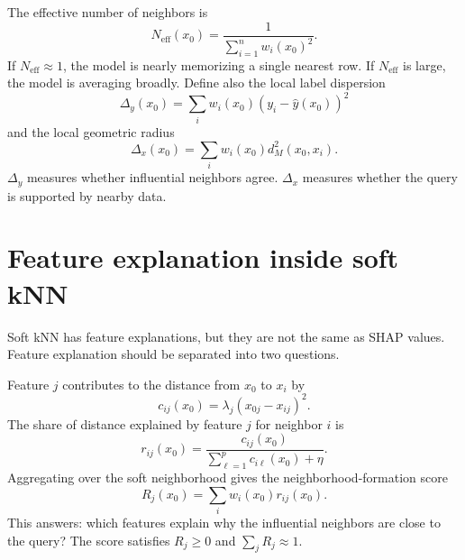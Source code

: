 \documentclass[11pt]{article}
\newcommand{\1}{\mathbf{1}}
\newcommand{\neff}{N_{\mathrm{eff}}}
\begin{document}
The effective number of neighbors is
\begin{equation}
\neff(x_0)=\frac{1}{\sum_{i=1}^n w_i(x_0)^2}.
\label{eq:neff}
\end{equation}
If $\neff\approx 1$, the model is nearly memorizing a single nearest row. If $\neff$ is large, the model is averaging broadly. Define also the local label dispersion
\begin{equation}
\Delta_y(x_0)=\sum_i w_i(x_0)(y_i-\hat y(x_0))^2
\label{eq:local_label_dispersion}
\end{equation}
and the local geometric radius
\begin{equation}
\Delta_x(x_0)=\sum_i w_i(x_0)d_M^2(x_0,x_i).
\label{eq:local_radius}
\end{equation}
$\Delta_y$ measures whether influential neighbors agree. $\Delta_x$ measures whether the query is supported by nearby data.

\section{Feature explanation inside soft kNN}

Soft kNN has feature explanations, but they are not the same as SHAP values. Feature explanation should be separated into two questions.

Feature $j$ contributes to the distance from $x_0$ to $x_i$ by
\begin{equation}
 c_{ij}(x_0)=\lambda_j(x_{0j}-x_{ij})^2.
\end{equation}
The share of distance explained by feature $j$ for neighbor $i$ is
\begin{equation}
 r_{ij}(x_0)=\frac{c_{ij}(x_0)}{\sum_{\ell=1}^p c_{i\ell}(x_0)+\eta}.
 \label{eq:distance_share}
\end{equation}
Aggregating over the soft neighborhood gives the neighborhood-formation score
\begin{equation}
 R_j(x_0)=\sum_i w_i(x_0)r_{ij}(x_0).
 \label{eq:Rj}
\end{equation}
This answers: which features explain why the influential neighbors are close to the query? The score satisfies $R_j\ge 0$ and $\sum_jR_j\approx 1$.
\end{document}
